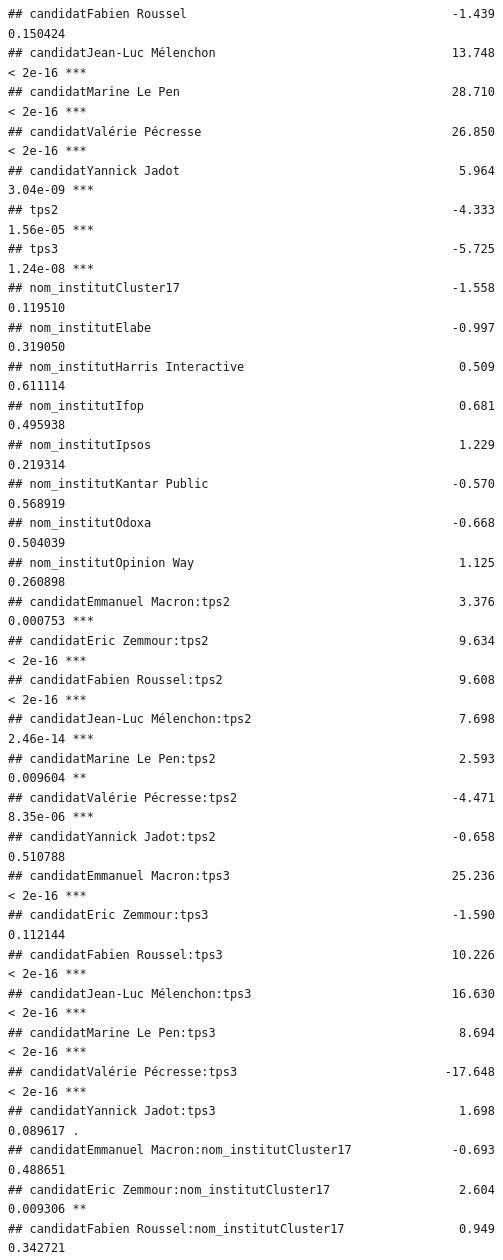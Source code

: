 \documentclass[
]{book}
\begin{document}
\begin{verbatim}
## candidatFabien Roussel                                     -1.439 0.150424    
## candidatJean-Luc Mélenchon                                 13.748  < 2e-16 ***
## candidatMarine Le Pen                                      28.710  < 2e-16 ***
## candidatValérie Pécresse                                   26.850  < 2e-16 ***
## candidatYannick Jadot                                       5.964 3.04e-09 ***
## tps2                                                       -4.333 1.56e-05 ***
## tps3                                                       -5.725 1.24e-08 ***
## nom_institutCluster17                                      -1.558 0.119510    
## nom_institutElabe                                          -0.997 0.319050    
## nom_institutHarris Interactive                              0.509 0.611114    
## nom_institutIfop                                            0.681 0.495938    
## nom_institutIpsos                                           1.229 0.219314    
## nom_institutKantar Public                                  -0.570 0.568919    
## nom_institutOdoxa                                          -0.668 0.504039    
## nom_institutOpinion Way                                     1.125 0.260898    
## candidatEmmanuel Macron:tps2                                3.376 0.000753 ***
## candidatEric Zemmour:tps2                                   9.634  < 2e-16 ***
## candidatFabien Roussel:tps2                                 9.608  < 2e-16 ***
## candidatJean-Luc Mélenchon:tps2                             7.698 2.46e-14 ***
## candidatMarine Le Pen:tps2                                  2.593 0.009604 ** 
## candidatValérie Pécresse:tps2                              -4.471 8.35e-06 ***
## candidatYannick Jadot:tps2                                 -0.658 0.510788    
## candidatEmmanuel Macron:tps3                               25.236  < 2e-16 ***
## candidatEric Zemmour:tps3                                  -1.590 0.112144    
## candidatFabien Roussel:tps3                                10.226  < 2e-16 ***
## candidatJean-Luc Mélenchon:tps3                            16.630  < 2e-16 ***
## candidatMarine Le Pen:tps3                                  8.694  < 2e-16 ***
## candidatValérie Pécresse:tps3                             -17.648  < 2e-16 ***
## candidatYannick Jadot:tps3                                  1.698 0.089617 .  
## candidatEmmanuel Macron:nom_institutCluster17              -0.693 0.488651    
## candidatEric Zemmour:nom_institutCluster17                  2.604 0.009306 ** 
## candidatFabien Roussel:nom_institutCluster17                0.949 0.342721    

\end{verbatim}
\end{document}

